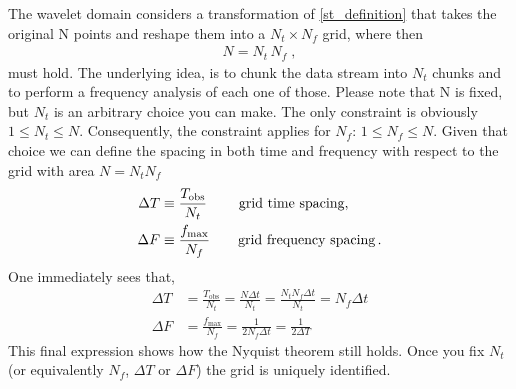 \documentclass[%
 reprint,
superscriptaddress,
nofootinbib,
 amsmath,amssymb,
 aps,
colorlinks = true, 
linkcolor = blue, 
urlcolor = blue, 
citecolor = blue, 
anchorcolor = blue,
]{revtex4-2}
\begin{document}
The wavelet domain considers a transformation of \eqref{st_definition} that takes the original N points and reshape them into a $N_t\times N_f$ grid, where then
\begin{align}\label{NtNf_def}
N=N_t\,N_f\;,
\end{align}
must hold. The underlying idea, is to chunk the data stream into $N_t$ chunks and to perform a frequency analysis of each one of those. Please note that N is fixed, but $N_t$ is an arbitrary choice you can make. The only constraint is obviously $1\le N_t\le N$. Consequently, the constraint applies for $N_f$: $1\le N_f\le N$.
Given that choice we can define the spacing in both time and frequency with respect to the grid with area $N = N_{t}N_{f}$
\begin{align}\label{DTDF}
\Delta T&\equiv\frac{T_{\text{obs}}}{N_t}\; \qquad \text{grid time spacing},\nonumber\\
\Delta F&\equiv\frac{f_{\rm max}}{N_f} \qquad \text{grid frequency spacing}\,.
\end{align}
One immediately sees that,
\begin{align}
\Delta T &= \frac{T_{\text{obs}}}{N_{t}} = \frac{N\Delta t}{N_{t}} = \frac{N_{t}N_{f}\Delta t}{N_{t}} = N_{f}\Delta t \\
\Delta F &= \frac{f_{\text{max}}}{N_{f}} = \frac{1}{2N_{f}\Delta t} = \frac{1}{2\Delta T}
\end{align}
This final expression shows how the Nyquist theorem still holds. Once you fix $N_t$ (or equivalently $N_f$, $\Delta T$ or $\Delta F$) the grid is uniquely identified.
\end{document}
